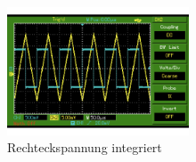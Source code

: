 \begin{figure}
  \centering
  \includegraphics[width=0.48\textwidth]{Oszilloskop3.pdf}
  \caption{Rechteckspannung integriert}
  \label{fig:intrecht}
\end{figure}
\FloatBarrier
%
%
%
